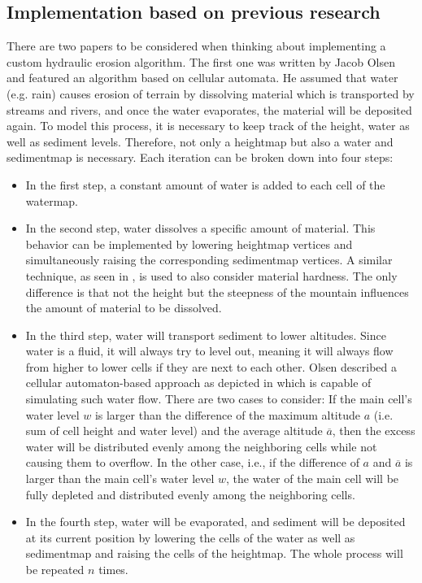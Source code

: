 \documentclass[11pt,a4paper,twoside,openright]{report}
\begin{document}
\subsection{Implementation based on previous research}
There are two papers to be considered when thinking about implementing a custom hydraulic erosion algorithm. The first one \cite{Olsen:2004} was written by Jacob Olsen and featured an algorithm based on cellular automata. He assumed that water (e.g. rain) causes erosion of terrain by dissolving material which is transported by streams and rivers, and once the water evaporates, the material will be deposited again. To model this process, it is necessary to keep track of the height, water as well as sediment levels. Therefore, not only a heightmap but also a water and sedimentmap is necessary. Each iteration can be broken down into four steps:
\begin{itemize}
\item In the first step, a constant amount of water is added to each cell of the watermap.
\item In the second step, water dissolves a specific amount of material. This behavior can be implemented by lowering heightmap vertices and simultaneously raising the corresponding sedimentmap vertices. A similar technique, as seen in , is used to also consider material hardness. The only difference is that not the height but the steepness of the mountain influences the amount of material to be dissolved.
\item In the third step, water will transport sediment to lower altitudes. Since water is a fluid, it will always try to level out, meaning it will always flow from higher to lower cells if they are next to each other. Olsen described a cellular automaton-based approach as depicted in  which is capable of simulating such water flow. There are two cases to consider: If the main cell's water level $w$ is larger than the difference of the maximum altitude $a$ (i.e. sum of cell height and water level) and the average altitude $\overline{a}$, then the excess water will be distributed evenly among the neighboring cells while not causing them to overflow. In the other case, i.e., if the difference of $a$ and $\overline{a}$ is larger than the main cell's water level $w$, the water of the main cell will be fully depleted and distributed evenly among the neighboring cells.
\item In the fourth step, water will be evaporated, and sediment will be deposited at its current position by lowering the cells of the water as well as sedimentmap and raising the cells of the heightmap. The whole process will be repeated $n$ times.
\end{itemize}
\end{document}
